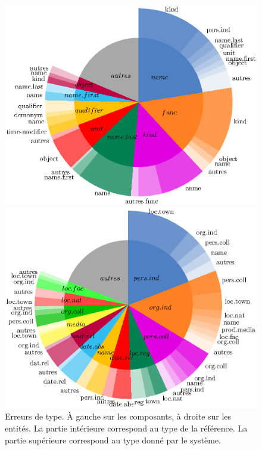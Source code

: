 \documentclass[PhD-Yoann-Dupont.tex]{subfiles}
\begin{document}
\begin{figure}
\begin{minipage}{0.49\linewidth}
    \centering
    \includegraphics[scale=0.6]{images/quaero/components-type}
\end{minipage}
\begin{minipage}{0.49\linewidth}
    \centering
    \includegraphics[scale=0.6]{images/quaero/entities-type}
\end{minipage}
\caption{Erreurs de type. À gauche sur les composants, à droite sur les entités. La partie intérieure correspond au type de la référence. La partie supérieure correspond au type donné par le système.}
\label{fig:type-errors-components}
\end{figure}
\end{document}
